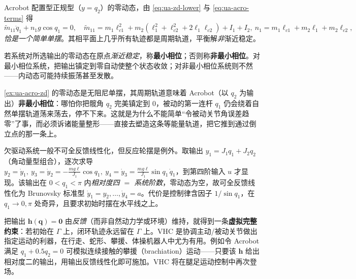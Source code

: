 \begin{example}[Acrobot 的零动态 $=$ 单摆]\label{ex:ua-acro-zd}
Acrobot 配置型正规型（$y=q_2$）的零动态，由 \cref{eq:ua-zd-lower} 与 \cref{eq:ua-acro-terms} 得
\[
  \tilde{m}_{11}\ddot{q}_1+n_1 g\cos q_1=0,\quad
  \tilde{m}_{11}=m_1\ell_{c1}^2+m_2(\ell_1^2+\ell_{c2}^2+2\ell_1\ell_{c2})+I_1+I_2,\ n_1=m_1\ell_{c1}+m_2\ell_1+m_2\ell_{c2},
\]
\emph{恰是一个简单单摆}。其相平面上几乎所有轨迹都是周期轨道，平衡解\emph{非}渐近稳定。
\end{example}

\begin{definition}\label{def:ua-minphase}
若系统对所选输出的零动态在原点\emph{渐近稳定}，称\textbf{最小相位}；否则称\textbf{非最小相位}。对最小相位系统，把输出镇定到零自动使整个状态收敛；对非最小相位系统则不然——内动态可能持续振荡甚至发散。
\end{definition}

\begin{insight}
\cref{ex:ua-acro-zd} 的零动态是无阻尼单摆，其周期轨道意味着 Acrobot（以 $q_2$ 为输出）\textbf{非最小相位}：哪怕你把髋角 $q_2$ 完美镇定到 $0$，被动的第一连杆 $q_1$ 仍会绕着自然单摆轨道荡来荡去，停不下来。这就是为什么不能简单“令被动关节角误差趋零”了事，而必须诉诸能量整形——直接去塑造这条等能量轨道，把它推到通过倒立点的那一条上。
\end{insight}

\begin{note}[反应轮摆是可全反馈线性化的例外]
欠驱动系统一般不可全反馈线性化，但反应轮摆是例外。取输出 $y_1=J_1 q_1+J_2 q_2$（角动量型组合），逐次求导 $y_2=\dot{y}_1,\ y_3=\dot{y}_2=-\tfrac{mg\ell}{J_1}\cos q_1,\ y_4=\dot{y}_3=\tfrac{mg\ell}{J_1}\sin q_1\,\dot{q}_1$，到第四阶输入 $u$ 才显现。该输出在 $0<q_1<\pi$ 内\emph{相对度四 $=$ 系统阶数}，零动态为空，故可全反馈线性化为 Brunovsky 标准型 $\dot{y}_1=y_2,\dots,\dot{y}_4=a$。代价是控制律含因子 $1/\sin q_1$，在 $q_1\to0,\pi$ 处奇异，且要求初始时摆在水平线之上。
\end{note}

\begin{note}
把输出 $\mathbf{h}(\mathbf{q})=\mathbf{0}$ 由\emph{反馈}（而非自然动力学或环境）维持，就得到一条\textbf{虚拟完整约束}：若初始在 $\Gamma$ 上，闭环轨迹永远留在 $\Gamma$ 上。VHC 是协调主动/被动关节做出指定运动的利器，在行走、蛇形、攀援、体操机器人中尤为有用。例如令 Acrobot 满足 $q_1+0.5q_2=0$ 可模拟连续接触的攀援（brachiation）运动——只要该 $\mathbf{h}$ 给出相对度二的输出，用输出反馈线性化即可施加。VHC 将在腿足运动控制中再次登场。
\end{note}

